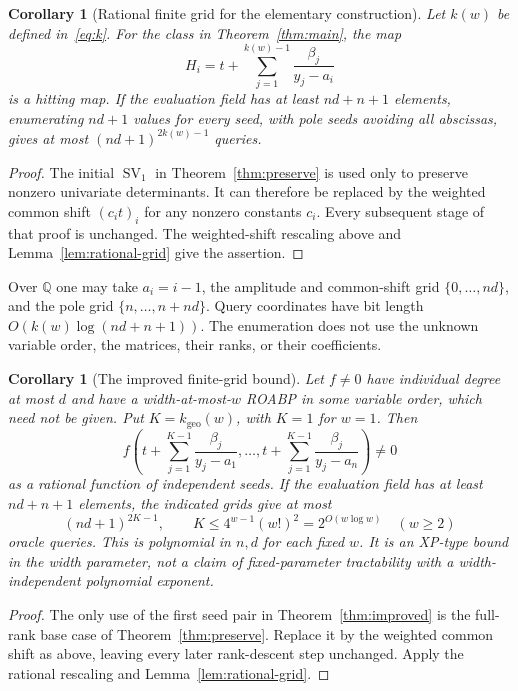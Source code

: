 \documentclass[11pt]{article}
\newtheorem{corollary}[theorem]{Corollary}
\theoremstyle{definition}\newtheorem{definition}[theorem]{Definition}
\theoremstyle{remark}\newtheorem{remark}[theorem]{Remark}
\newcommand{\SV}{\operatorname{SV}}
\begin{document}
\begin{corollary}[Rational finite grid for the elementary construction]
Let $k(w)$ be defined in~\eqref{eq:k}. For the class in Theorem~\ref{thm:main}, the map
\[
 H_i=t+\sum_{j=1}^{k(w)-1}\frac{\beta_j}{y_j-a_i}
\]
is a hitting map. If the evaluation field has at least $nd+n+1$ elements, enumerating $nd+1$ values for every seed, with pole seeds avoiding all abscissas, gives at most $(nd+1)^{2k(w)-1}$ queries.
\end{corollary}
\begin{proof}
The initial $\SV_1$ in Theorem~\ref{thm:preserve} is used only to preserve nonzero univariate determinants. It can therefore be replaced by the weighted common shift $(c_it)_i$ for any nonzero constants $c_i$. Every subsequent stage of that proof is unchanged. The weighted-shift rescaling above and Lemma~\ref{lem:rational-grid} give the assertion.
\end{proof}
Over $\mathbb Q$ one may take $a_i=i-1$, the amplitude and common-shift grid $\{0,\ldots,nd\}$, and the pole grid $\{n,\ldots,n+nd\}$. Query coordinates have bit length $O(k(w)\log(nd+n+1))$. The enumeration does not use the unknown variable order, the matrices, their ranks, or their coefficients.


\begin{corollary}[The improved finite-grid bound]\label{cor:focused-main}
Let $f\ne0$ have individual degree at most $d$ and have a width-at-most-$w$
ROABP in some variable order, which need not be given. Put
$K=k_{\mathrm{geo}}(w)$, with $K=1$ for $w=1$. Then
\[
 f\left(t+\sum_{j=1}^{K-1}\frac{\beta_j}{y_j-a_1},\ldots,
         t+\sum_{j=1}^{K-1}\frac{\beta_j}{y_j-a_n}\right)\ne0
\]
as a rational function of independent seeds. If the evaluation field has
at least $nd+n+1$ elements, the indicated grids give at most
\[
 (nd+1)^{2K-1},\qquad K\le4^{w-1}(w!)^2=2^{O(w\log w)}
 \quad(w\ge2)
\]
oracle queries. This is polynomial in $n,d$ for each fixed $w$. It is an
XP-type bound in the width parameter, not a claim of fixed-parameter
tractability with a width-independent polynomial exponent.
\end{corollary}
\begin{proof}
The only use of the first seed pair in Theorem~\ref{thm:improved} is the
full-rank base case of Theorem~\ref{thm:preserve}. Replace it by the weighted
common shift as above, leaving every later rank-descent step unchanged.
Apply the rational rescaling and Lemma~\ref{lem:rational-grid}.
\end{proof}
\end{document}
